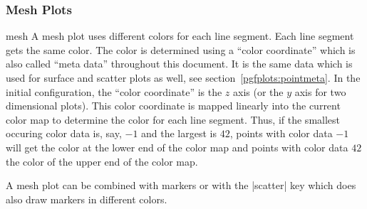 \subsubsection{Mesh Plots}
\begin{plottype}{mesh}
	A mesh plot uses different colors for each line segment. Each line segment gets the same color. The color is determined using a ``color coordinate'' which is also called ``meta data'' throughout this document. It is the same data which is used for surface and scatter plots as well, see section~\ref{pgfplots:pointmeta}. In the initial configuration, the ``color coordinate'' is the $z$ axis (or the $y$ axis for two dimensional plots). This color coordinate is mapped linearly into the current color map to determine the color for each line segment. Thus, if the smallest occuring color data is, say, $-1$ and the largest is $42$, points with color data $-1$ will get the color at the lower end of the color map and points with color data $42$ the color of the upper end of the color map.

\pgfplotsexpensiveexample
\begin{codeexample}[]
\end{codeexample}

	A mesh plot can be combined with markers or with the |scatter| key which does also draw markers in different colors.

\pgfplotsexpensiveexample
\begin{codeexample}[]
\end{codeexample}

\pgfplotsexpensiveexample
\begin{codeexample}[]
\end{codeexample}


\end{plottype}
